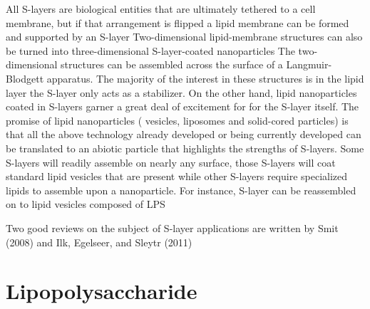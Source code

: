   All \acp{S-layer} are biological entities that are ultimately tethered to a cell membrane, but if that arrangement is flipped a lipid membrane can be formed and supported by an \ac{S-layer} Two-dimensional lipid-membrane structures can also be turned into three-dimensional \ac{S-layer}-coated nanoparticles The two-dimensional structures can be assembled across the surface of a Langmuir-Blodgett apparatus. The majority of the interest in these structures is in the lipid layer the \ac{S-layer} only acts as a stabilizer. On the other hand, lipid nanoparticles coated in \acp{S-layer} garner a great deal of excitement for for the \ac{S-layer} itself. The promise of lipid nanoparticles (\ie{} vesicles, liposomes and solid-cored particles) is that all the above technology already developed or being currently developed can be translated to an abiotic particle that highlights the strengths of \acp{S-layer}. Some \acp{S-layer} will readily assemble on nearly any surface, those \acp{S-layer} will coat standard lipid vesicles that are present while other \acp{S-layer} require specialized lipids to assemble upon a nanoparticle. For instance, \caulobacter \ac{S-layer} can be reassembled on to lipid vesicles composed of \caulobacter{} \ac{LPS} 
  
  Two good reviews on the subject of \ac{S-layer} applications are written by Smit (2008) and Ilk, Egelseer, and Sleytr (2011)

  \section{Lipopolysaccharide} \label{sec:intro-lps}


